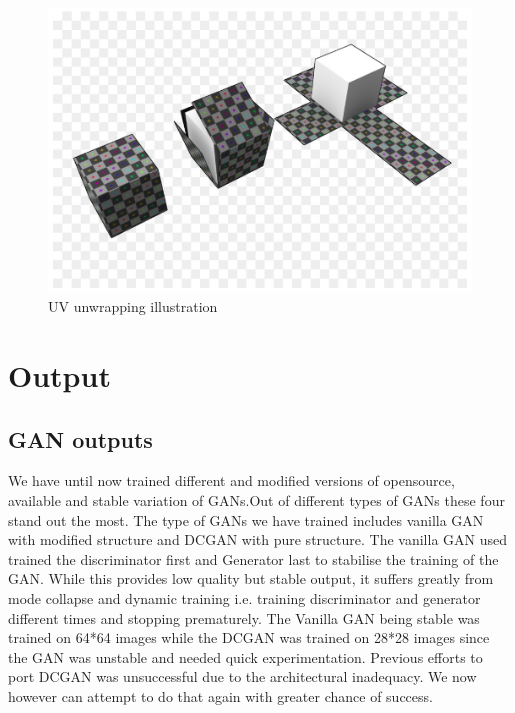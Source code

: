 \documentclass{article}
\begin{document}
\begin{figure}[H]
    \centering
    \includegraphics[width=15cm]{images/UVUnwrapping.png}
    \caption{UV unwrapping illustration}
\end{figure}

\newpage    
\section{Output}

\subsection{GAN outputs}
We have until now trained different and modified versions of opensource, available and stable variation of GANs.Out of different types of GANs these four stand out the most. The type of GANs we have trained includes vanilla GAN with modified structure and DCGAN with pure structure. The vanilla GAN used trained the discriminator first and Generator last to stabilise the training of the GAN. While this provides low quality but stable output, it suffers greatly from mode collapse and dynamic training i.e. training discriminator and generator different times and stopping prematurely. The Vanilla GAN being stable was trained on 64*64 images while the DCGAN was trained on 28*28 images since the GAN was unstable and needed quick experimentation. Previous efforts to port DCGAN was unsuccessful due to the architectural inadequacy. We now however can attempt to do that again with greater chance of success.
\end{document}
